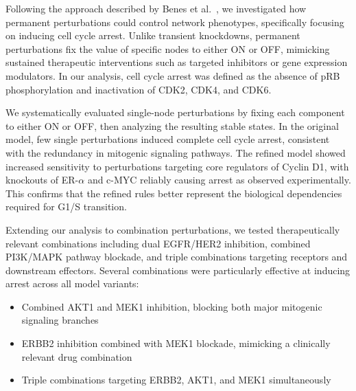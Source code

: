 \documentclass[a4paper,12pt]{article}
\begin{document}
Following the approach described by Benes et al.~\cite{Benes2023}, we investigated how permanent perturbations could control network phenotypes, specifically focusing on inducing cell cycle arrest. Unlike transient knockdowns, permanent perturbations fix the value of specific nodes to either ON or OFF, mimicking sustained therapeutic interventions such as targeted inhibitors or gene expression modulators. In our analysis, cell cycle arrest was defined as the absence of pRB phosphorylation and inactivation of CDK2, CDK4, and CDK6.

We systematically evaluated single-node perturbations by fixing each component to either ON or OFF, then analyzing the resulting stable states. In the original model, few single perturbations induced complete cell cycle arrest, consistent with the redundancy in mitogenic signaling pathways. The refined model showed increased sensitivity to perturbations targeting core regulators of Cyclin D1, with knockouts of ER-$\alpha$ and c-MYC reliably causing arrest as observed experimentally. This confirms that the refined rules better represent the biological dependencies required for G1/S transition.

Extending our analysis to combination perturbations, we tested therapeutically relevant combinations including dual EGFR/HER2 inhibition, combined PI3K/MAPK pathway blockade, and triple combinations targeting receptors and downstream effectors. Several combinations were particularly effective at inducing arrest across all model variants:

\begin{itemize}
    \item Combined AKT1 and MEK1 inhibition, blocking both major mitogenic signaling branches
    \item ERBB2 inhibition combined with MEK1 blockade, mimicking a clinically relevant drug combination
    \item Triple combinations targeting ERBB2, AKT1, and MEK1 simultaneously
\end{itemize}
\end{document}
